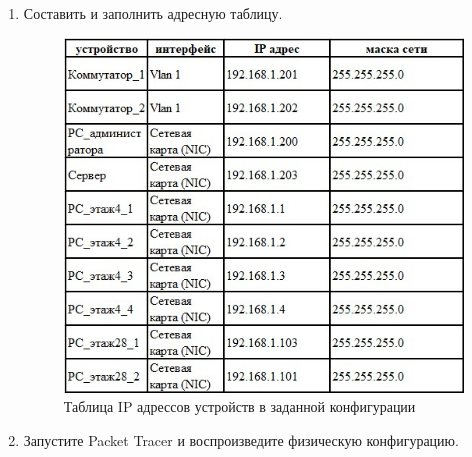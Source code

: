 \documentclass[bachelor, och, labwork]{shiza}
\begin{document}


\begin{enumerate}
    
    \item Составить и заполнить адресную таблицу.
    
    \begin{figure}[H]
        \centering      %
        \includegraphics[width=1\textwidth]{1}
        \caption{Таблица IP адрессов устройств в заданной конфигурации}
        \label{fig:image1}
    \end{figure}

    \item Запустите Packet Tracer и воспроизведите физическую конфигурацию.
    

\end{enumerate}
\end{document}
